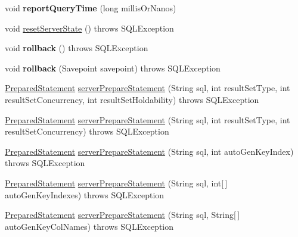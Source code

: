 \begin{DoxyCompactItemize}
void {\bfseries report\+Query\+Time} (long millis\+Or\+Nanos)
\item 
void \mbox{\hyperlink{classcom_1_1mysql_1_1jdbc_1_1_multi_host_my_s_q_l_connection_a5099a4923c0bc5e2bfb8236dfe88453c}{reset\+Server\+State}} ()  throws S\+Q\+L\+Exception 
\item 
\mbox{\label{classcom_1_1mysql_1_1jdbc_1_1_multi_host_my_s_q_l_connection_a18cd6c7ad9651dd1595e20dce94af3d8}} 
void {\bfseries rollback} ()  throws S\+Q\+L\+Exception 
\item 
\mbox{\label{classcom_1_1mysql_1_1jdbc_1_1_multi_host_my_s_q_l_connection_aa0f2f54db154fe02c566a8950bb9f9be}} 
void {\bfseries rollback} (Savepoint savepoint)  throws S\+Q\+L\+Exception 
\item 
\mbox{\hyperlink{classcom_1_1mysql_1_1jdbc_1_1_prepared_statement}{Prepared\+Statement}} \mbox{\hyperlink{classcom_1_1mysql_1_1jdbc_1_1_multi_host_my_s_q_l_connection_ac7585cb7791fb3f439f1dec002b9486e}{server\+Prepare\+Statement}} (String sql, int result\+Set\+Type, int result\+Set\+Concurrency, int result\+Set\+Holdability)  throws S\+Q\+L\+Exception 
\item 
\mbox{\hyperlink{classcom_1_1mysql_1_1jdbc_1_1_prepared_statement}{Prepared\+Statement}} \mbox{\hyperlink{classcom_1_1mysql_1_1jdbc_1_1_multi_host_my_s_q_l_connection_a6327530074443cc7c221a1323f871b65}{server\+Prepare\+Statement}} (String sql, int result\+Set\+Type, int result\+Set\+Concurrency)  throws S\+Q\+L\+Exception 
\item 
\mbox{\hyperlink{classcom_1_1mysql_1_1jdbc_1_1_prepared_statement}{Prepared\+Statement}} \mbox{\hyperlink{classcom_1_1mysql_1_1jdbc_1_1_multi_host_my_s_q_l_connection_ab243fd44a8b19e2cf489e88a469dcee3}{server\+Prepare\+Statement}} (String sql, int auto\+Gen\+Key\+Index)  throws S\+Q\+L\+Exception 
\item 
\mbox{\hyperlink{classcom_1_1mysql_1_1jdbc_1_1_prepared_statement}{Prepared\+Statement}} \mbox{\hyperlink{classcom_1_1mysql_1_1jdbc_1_1_multi_host_my_s_q_l_connection_a62feb6ab7216c441bae377f5b7c738ac}{server\+Prepare\+Statement}} (String sql, int\mbox{[}$\,$\mbox{]} auto\+Gen\+Key\+Indexes)  throws S\+Q\+L\+Exception 
\item 
\mbox{\hyperlink{classcom_1_1mysql_1_1jdbc_1_1_prepared_statement}{Prepared\+Statement}} \mbox{\hyperlink{classcom_1_1mysql_1_1jdbc_1_1_multi_host_my_s_q_l_connection_a406fc0eb56f50ed44dc36158ab45e8d0}{server\+Prepare\+Statement}} (String sql, String\mbox{[}$\,$\mbox{]} auto\+Gen\+Key\+Col\+Names)  throws S\+Q\+L\+Exception 

\end{DoxyCompactItemize}
